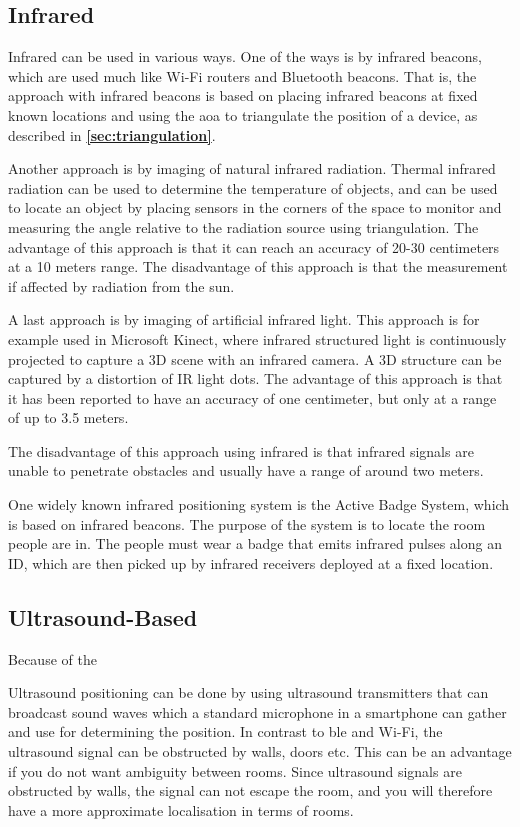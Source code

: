 \subsection{Infrared}
Infrared can be used in various ways. One of the ways is by infrared beacons, which are used much like Wi-Fi routers and Bluetooth beacons. That is, the approach with infrared beacons is based on placing infrared beacons at fixed known locations and using the \gls{aoa} to triangulate the position of a device, as described in \textbf{\autoref{sec:triangulation}}.\cite{HabilitationThesis}

Another approach is by imaging of natural infrared radiation. Thermal infrared radiation can be used to determine the temperature of objects, and can be used to locate an object by placing sensors in the corners of the space to monitor and measuring the angle relative to the radiation source using triangulation.
The advantage of this approach is that it can reach an accuracy of 20-30 centimeters at a 10 meters range.
The disadvantage of this approach is that the measurement if affected by radiation from the sun.\cite{HabilitationThesis}

A last approach is by imaging of artificial infrared light. This approach is for example used in Microsoft Kinect, where infrared structured light is continuously projected to capture a 3D scene with an infrared camera. A 3D structure can be captured by a distortion of IR light dots.
The advantage of this approach is that it has been reported to have an accuracy of one centimeter, but only at a range of up to 3.5 meters.\cite{HabilitationThesis}

The disadvantage of this approach using infrared is that infrared signals are unable to penetrate obstacles and usually have a range of around two meters\cite{HabilitationThesis}.

One widely known infrared positioning system is the Active Badge System, which is based on infrared beacons. The purpose of the system is to locate the room people are in. The people must wear a badge that emits infrared pulses along an ID, which are then picked up by infrared receivers deployed at a fixed location.\cite{HabilitationThesis}


\subsection{Ultrasound-Based}

Because of the 

Ultrasound positioning can be done by using ultrasound transmitters that can broadcast sound waves which a standard microphone in a smartphone can gather and use for determining the position\cite{IPSMapsPeople}. In contrast to \gls{ble} and Wi-Fi, the ultrasound signal can be obstructed by walls, doors etc. This can be an advantage if you do not want ambiguity between rooms. Since ultrasound signals are obstructed by walls, the signal can not escape the room, and you will therefore have a more approximate localisation in terms of rooms. \cite{leverage-ultrasound}

